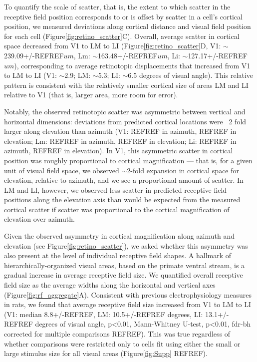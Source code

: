 To quantify the scale of scatter, that is, the extent to which scatter in the receptive field position corresponds to or is offset by scatter in a cell's cortical position, we measured deviations along cortical distance and visual field position for each cell (Figure\ref{fig:retino_scatter}C). Overall, average scatter in cortical space decreased from V1 to LM to LI (Figure\ref{fig:retino_scatter}D, V1: $\sim$239.09+/-REFREF$um$, Lm: $\sim$163.48+/-REFREF$um$, Li: $\sim$127.17+/-REFREF$um$), corresponding to average retinotopic displacements that increased from V1 to LM to LI (V1: $\sim$2.9; LM: $\sim$5.3; LI: $\sim$6.5 degrees of visual angle). This relative pattern is consistent with the relatively smaller cortical size of areas LM and LI relative to V1 (that is, larger area, more room for error).  

Notably, the observed retinotopic scatter was asymmetric between vertical and horizontal dimensions:  deviations from predicted cortical locations were ~2 fold larger along elevation than azimuth (V1: REFREF in azimuth, REFREF in elevation; Lm: REFREF in azimuth, REFREF in elevation; Li: REFREF in azimuth, REFREF in elevation). In V1, this asymmetric scatter in cortical position was roughly proportional to cortical magnification --- that is, for a given unit of visual field space, we observed $\sim$2-fold expansion in cortical space  for elevation, relative to azimuth, and we see a proportional amount of scatter. In LM and LI, however, we observed less scatter in predicted receptive field positions along the elevation axis than would be expected from the measured cortical scatter if scatter was proportional to the cortical magnification of elevation over azimuth.


Given the observed asymmetry in cortical magnification along azimuth and elevation (see Figure\ref{fig:retino_scatter}), we asked whether this asymmetry was also present at the level of individual receptive field shapes. A hallmark of hierarchically-organized visual areas, based on the primate ventral stream, is a gradual increase in average receptive field size\cite{RustREFREF, Vermaerke2014, Siegle2019AAreas, Tafazoli2017}. We quantified overall receptive field size as the average widths along the horizontal and vertical axes (Figure\ref{fig:rf_aggregate}A). Consistent with previous electrophysiology measures in rats\cite{Vermaercke2014, Tafazoli2017}, we found that average receptive field size increased from V1 to LM to LI (V1: median 8.8+/-REFREF, LM: 10.5+/-REFREF degrees, LI: 13.1+/-REFREF degrees of visual angle, p<0.01, Mann-Whitney U-test, p<0.01, fdr-bh corrected for multiple comparisons REFREF). This was true regardless of whether comparisons were restricted only to cells fit using either the small or large stimulus size for all visual areas (Figure\ref{fig:Supp} REFREF).  

